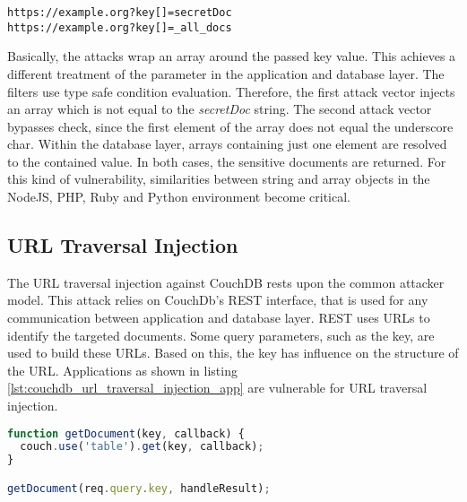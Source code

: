 \begin{lstlisting}[caption={Attack vectors on CouchDB for array key injection via HTTP GET}, label={lst:couch_array_key_injection_attack}]
https://example.org?key[]=secretDoc
https://example.org?key[]=_all_docs
\end{lstlisting}

Basically, the attacks wrap an array around the passed key value. This achieves a different treatment of the parameter in the application and database layer. The filters use type safe condition evaluation. Therefore, the first attack vector injects an array which is not equal to the \emph{secretDoc} string. The second attack vector bypasses check, since the first element of the array does not equal the underscore char. Within the database layer, arrays containing just one element are resolved to the contained value. In both cases, the sensitive documents are returned. For this kind of vulnerability, similarities between string and array objects in the NodeJS, PHP, Ruby and Python environment become critical.   

\subsection{URL Traversal Injection}
The URL traversal injection against CouchDB rests upon the common attacker model. This attack relies on CouchDb's REST interface, that is used for any communication between application and database layer. REST uses URLs to identify the targeted documents. Some query parameters, such as the key, are used to build these URLs. Based on this, the key has influence on the structure of the URL. Applications as shown in listing \ref{lst:couchdb_url_traversal_injection_app} are vulnerable for URL traversal injection. \\

\begin{lstlisting}[caption={Vulnerable NodeJS example for URL traversal injection on CouchDB}, label={lst:couchdb_url_traversal_injection_app}, language=JavaScript]
function getDocument(key, callback) {
  couch.use('table').get(key, callback);
}

getDocument(req.query.key, handleResult);
\end{lstlisting}


